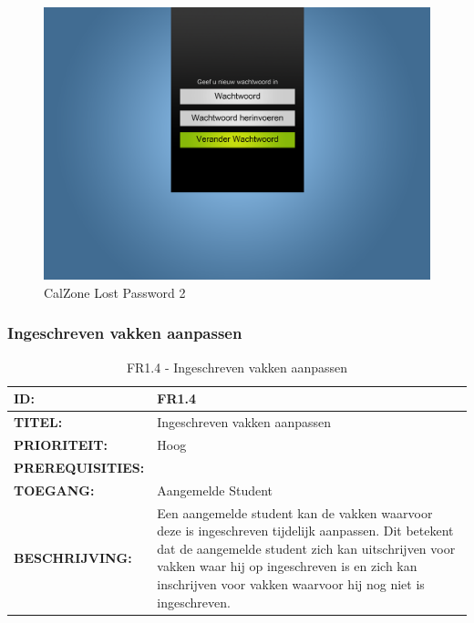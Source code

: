 \begin{center}
\begin{figure}[H]
\caption{CalZone Lost Password 2}
\centerline{\includegraphics[scale=0.4]{img/Calzonelostpassword2}}
\label{fig:CalZone Lost Password 2}
\end{figure}
\end{center}

\subsubsection{Ingeschreven vakken aanpassen}
\noindent\begin{table}[H]
            \begin{tabular}{l | p{10cm}}
                \textbf{ID:} & FR1.4\\ \hline
                \textbf{TITEL:} & Ingeschreven vakken aanpassen\\ \hline
                \textbf{PRIORITEIT:} &  Hoog \\ \hline
                \textbf{PREREQUISITIES:} & \\ \hline
                \textbf{TOEGANG:} &  Aangemelde Student \\ \hline
                \textbf{BESCHRIJVING:} & Een aangemelde student kan de vakken waarvoor deze is ingeschreven tijdelijk aanpassen. 
                						Dit betekent dat de aangemelde student zich kan uitschrijven voor vakken waar hij op ingeschreven is en  zich kan inschrijven voor vakken waarvoor hij nog niet is ingeschreven.\\
            \end{tabular}\\
            \caption{FR1.4 - Ingeschreven vakken aanpassen}
            \label{tab:FR1.4 - Ingeschreven vakken aanpassen}
        \end{table}
        
